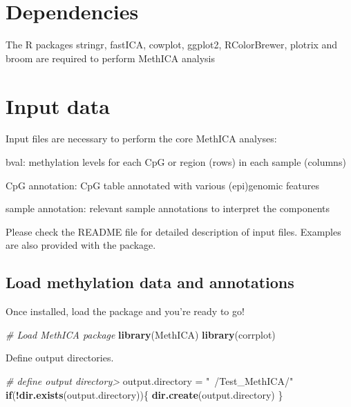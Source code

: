 \documentclass[]{article}
\newenvironment{Shaded}{\begin{snugshade}}{\end{snugshade}}
\newcommand{\KeywordTok}[1]{\textcolor[rgb]{0.13,0.29,0.53}{\textbf{#1}}}
\newcommand{\StringTok}[1]{\textcolor[rgb]{0.31,0.60,0.02}{#1}}
\newcommand{\CommentTok}[1]{\textcolor[rgb]{0.56,0.35,0.01}{\textit{#1}}}
\newcommand{\ControlFlowTok}[1]{\textcolor[rgb]{0.13,0.29,0.53}{\textbf{#1}}}
\newcommand{\OperatorTok}[1]{\textcolor[rgb]{0.81,0.36,0.00}{\textbf{#1}}}
\newcommand{\NormalTok}[1]{#1}
\begin{document}
\section{Dependencies}\label{dependencies}

The R packages stringr, fastICA, cowplot, ggplot2, RColorBrewer, plotrix
and broom are required to perform MethICA analysis

\section{Input data}\label{input-data}

Input files are necessary to perform the core MethICA analyses:

bval: methylation levels for each CpG or region (rows) in each sample
(columns)

CpG annotation: CpG table annotated with various (epi)genomic features

sample annotation: relevant sample annotations to interpret the
components

Please check the README file for detailed description of input files.
Examples are also provided with the package.

\subsection{Load methylation data and
annotations}\label{load-methylation-data-and-annotations}

Once installed, load the package and you're ready to go!

\begin{Shaded}
\begin{Highlighting}[]
\CommentTok{# Load MethICA package}
\KeywordTok{library}\NormalTok{(MethICA)}
\KeywordTok{library}\NormalTok{(corrplot)}
\end{Highlighting}
\end{Shaded}

Define output directories.

\begin{Shaded}
\begin{Highlighting}[]
\CommentTok{# define output directory> }
\NormalTok{output.directory =}\StringTok{ "~/Test_MethICA/"}
\ControlFlowTok{if}\NormalTok{(}\OperatorTok{!}\KeywordTok{dir.exists}\NormalTok{(output.directory))\{}
  \KeywordTok{dir.create}\NormalTok{(output.directory)}
\NormalTok{\}}
\end{Highlighting}
\end{Shaded}
\end{document}

